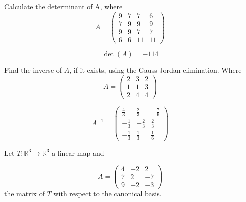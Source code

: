 \begin{questions}

\question Calculate the determinant of A, where
$$
A=\left(\begin{array}{rrrr}
9 & 7 & 7 & 6 \\
7 & 9 & 9 & 9 \\
9 & 9 & 7 & 7 \\
6 & 6 & 11 & 11
\end{array}\right)
$$

\begin{solution}
$$\det(A)=-114$$
\end{solution}

\question Find the inverse of $A$, if it exists, using the Gauss-Jordan elimination. Where
$$
A=\left(\begin{array}{rrr}
2 & 3 & 2 \\
1 & 1 & 3 \\
2 & 4 & 4
\end{array}\right)
$$

\begin{solution}
$$A^{-1}=\left(\begin{array}{rrr}
\frac{4}{3} & \frac{2}{3} & -\frac{7}{6} \\
-\frac{1}{3} & -\frac{2}{3} & \frac{2}{3} \\
-\frac{1}{3} & \frac{1}{3} & \frac{1}{6}
\end{array}\right)$$
\end{solution}

\question Let $T:\mathbb{R}^3\rightarrow\mathbb{R}^3$  a linear map and
 
$$
A=\left(\begin{array}{rrr}
4 & -2 & 2 \\
7 & 2 & -7 \\
9 & -2 & -3
\end{array}\right)
$$
the matrix of $T$ with respect to the canonical basis.
\end{questions}
